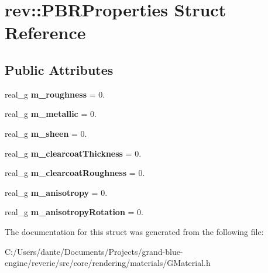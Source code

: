 \hypertarget{structrev_1_1_p_b_r_properties}{}\section{rev\+::P\+B\+R\+Properties Struct Reference}
\label{structrev_1_1_p_b_r_properties}
\subsection*{Public Attributes}
\begin{DoxyCompactItemize}
\item 
\mbox{\label{structrev_1_1_p_b_r_properties_af1b3a92467f152b9c7b9c9b81a8b54f7}} 
real\+\_\+g {\bfseries m\+\_\+roughness} = 0.
\item 
\mbox{\label{structrev_1_1_p_b_r_properties_ace58201dd0bfa22350d34fb07ea715e2}} 
real\+\_\+g {\bfseries m\+\_\+metallic} = 0.
\item 
\mbox{\label{structrev_1_1_p_b_r_properties_a63bce7bb8e7bf5cae6d98d89f7e81cc4}} 
real\+\_\+g {\bfseries m\+\_\+sheen} = 0.
\item 
\mbox{\label{structrev_1_1_p_b_r_properties_ae64022967974e3ccff933c972032ac8f}} 
real\+\_\+g {\bfseries m\+\_\+clearcoat\+Thickness} = 0.
\item 
\mbox{\label{structrev_1_1_p_b_r_properties_a525a183f28390212bf42036194c94352}} 
real\+\_\+g {\bfseries m\+\_\+clearcoat\+Roughness} = 0.
\item 
\mbox{\label{structrev_1_1_p_b_r_properties_abca53c0500fa77ac628d922386d0b7ad}} 
real\+\_\+g {\bfseries m\+\_\+anisotropy} = 0.
\item 
\mbox{\label{structrev_1_1_p_b_r_properties_a05df3bf7eaf397fe2956693007ffab50}} 
real\+\_\+g {\bfseries m\+\_\+anisotropy\+Rotation} = 0.
\end{DoxyCompactItemize}


The documentation for this struct was generated from the following file\+:\begin{DoxyCompactItemize}
\item 
C\+:/\+Users/dante/\+Documents/\+Projects/grand-\/blue-\/engine/reverie/src/core/rendering/materials/G\+Material.\+h\end{DoxyCompactItemize}
